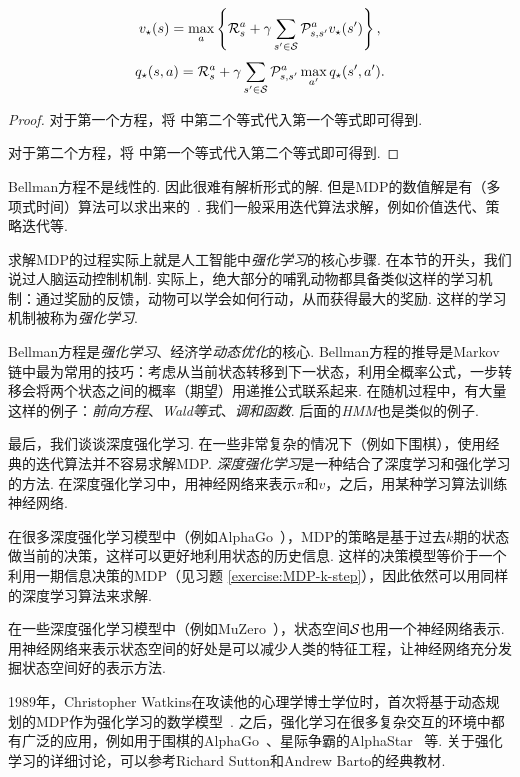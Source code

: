 \begin{theorem}[Bellman方程]
\[v_\star(s) = \max_a\left\{\mathcal R_s^a + \gamma \sum_{s'\in \mathcal S}\mathcal P_{s,s'}^av_\star(s')\right\},\]
\[q_\star(s,a) = \mathcal R_s^a+\gamma \sum_{s'\in \mathcal S}\mathcal P_{s,s'}^a\max_{a'}q_\star(s',a').\]
\end{theorem}
\begin{proof}
    对于第一个方程，将 中第二个等式代入第一个等式即可得到. 

    对于第二个方程，将 中第一个等式代入第二个等式即可得到. 
\end{proof}

Bellman方程不是线性的. 因此很难有解析形式的解. 但是MDP的数值解是有（多项式时间）算法可以求出来的~\cite{littmanComplexitySolvingMarkov1995}. 我们一般采用迭代算法求解，例如价值迭代、策略迭代等.

求解MDP的过程实际上就是人工智能中\textit{强化学习}的核心步骤. 在本节的开头，我们说过人脑运动控制机制. 实际上，绝大部分的哺乳动物都具备类似这样的学习机制：通过奖励的反馈，动物可以学会如何行动，从而获得最大的奖励. 这样的学习机制被称为\textit{强化学习}. 

\begin{remark}
Bellman方程是\textit{强化学习}、经济学\textit{动态优化}的核心. Bellman方程的推导是Markov链中最为常用的技巧：考虑从当前状态转移到下一状态，利用全概率公式，一步转移会将两个状态之间的概率（期望）用递推公式联系起来. 在随机过程中，有大量这样的例子：\textit{前向方程}、\textit{Wald等式}、\textit{调和函数}. 后面的\textit{HMM}也是类似的例子.    
\end{remark}

最后，我们谈谈深度强化学习. 在一些非常复杂的情况下（例如下围棋），使用经典的迭代算法并不容易求解MDP. \textit{深度强化学习}是一种结合了深度学习和强化学习的方法. 在深度强化学习中，用神经网络来表示$\pi$和$v$，之后，用某种学习算法训练神经网络. 

在很多深度强化学习模型中（例如AlphaGo~\cite{silverMasteringGameGo2016}），MDP的策略是基于过去$k$期的状态做当前的决策，这样可以更好地利用状态的历史信息. 这样的决策模型等价于一个利用一期信息决策的MDP（见习题 \ref{exercise:MDP-k-step}），因此依然可以用同样的深度学习算法来求解. 

在一些深度强化学习模型中（例如MuZero~\cite{schrittwieserMasteringAtariGo2020}），状态空间$\mathcal S$也用一个神经网络表示. 用神经网络来表示状态空间的好处是可以减少人类的特征工程，让神经网络充分发掘状态空间好的表示方法.

\begin{remark}
    1989年，Christopher Watkins在攻读他的心理学博士学位时，首次将基于动态规划的MDP作为强化学习的数学模型~\cite{watkinsLearningDelayedRewards1989}. 之后，强化学习在很多复杂交互的环境中都有广泛的应用，例如用于围棋的AlphaGo~\cite{silverMasteringGameGo2016}、星际争霸的AlphaStar~\cite{vinyalsGrandmasterLevelStarCraft2019} 等. 关于强化学习的详细讨论，可以参考Richard Sutton和Andrew Barto的经典教材\cite{suttonReinforcementLearningIntroduction2018}. 
\end{remark}

